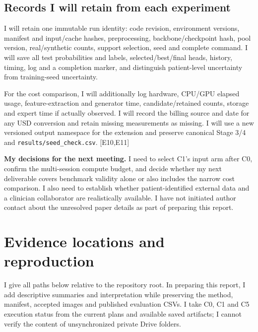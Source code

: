 \documentclass[11pt,a4paper]{article}
\newcommand{\file}[1]{\nolinkurl{#1}}
\newcommand{\ev}[1]{\textcolor{Link}{\textsf{[#1]}}}
\begin{document}
\subsection{Records I will retain from each experiment}

I will retain one immutable run identity: code revision, environment versions,
manifest and input/cache hashes, preprocessing, backbone/checkpoint hash,
pool version, real/synthetic counts, support selection, seed and complete
command. I will save all test probabilities and labels, selected/best/final
heads, history, timing, log and a completion marker, and distinguish
patient-level uncertainty from training-seed uncertainty.

For the cost comparison, I will additionally log hardware, CPU/GPU elapsed
usage, feature-extraction and generator time, candidate/retained counts,
storage and expert time if actually observed. I will record the billing
source and date for any USD conversion and retain missing measurements as
missing. I will use a new versioned output namespace for the extension and
preserve canonical Stage 3/4 and \file{results/seed_check.csv}. \ev{E10,E11}

\textbf{My decisions for the next meeting.} I need to select C1's input arm
after C0, confirm the multi-session compute budget, and decide whether my
next deliverable covers benchmark validity alone or also includes the narrow
cost comparison. I also need to establish whether patient-identified external
data and a clinician collaborator are realistically available. I have not
initiated author contact about the unresolved paper details as part of
preparing this report.

\appendix
\section{Evidence locations and reproduction}

I give all paths below relative to the repository root. In preparing this
report, I add descriptive summaries and interpretation while preserving the
method, manifest, accepted images and published evaluation CSVs. I take C0,
C1 and C5 execution status from the current plans and available saved
artifacts; I cannot verify the content of unsynchronized private Drive folders.
\end{document}
